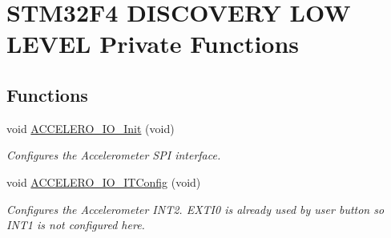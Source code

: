 \hypertarget{group___s_t_m32_f4___d_i_s_c_o_v_e_r_y___l_o_w___l_e_v_e_l___private___functions}{}\section{S\+T\+M32\+F4 D\+I\+S\+C\+O\+V\+E\+RY L\+OW L\+E\+V\+EL Private Functions}
\label{group___s_t_m32_f4___d_i_s_c_o_v_e_r_y___l_o_w___l_e_v_e_l___private___functions}
\subsection*{Functions}
\begin{DoxyCompactItemize}
\item 
\mbox{\label{group___s_t_m32_f4___d_i_s_c_o_v_e_r_y___l_o_w___l_e_v_e_l___private___functions_gaeb312e0ba50244c3008de6441167f181}} 
void \mbox{\hyperlink{group___s_t_m32_f4___d_i_s_c_o_v_e_r_y___l_o_w___l_e_v_e_l___private___functions_gaeb312e0ba50244c3008de6441167f181}{A\+C\+C\+E\+L\+E\+R\+O\+\_\+\+I\+O\+\_\+\+Init}} (void)
\begin{DoxyCompactList}\small\item\em Configures the Accelerometer S\+PI interface. \end{DoxyCompactList}\item 
\mbox{\label{group___s_t_m32_f4___d_i_s_c_o_v_e_r_y___l_o_w___l_e_v_e_l___private___functions_gacb0cf2419ee11c6c47c694e80f1e217b}} 
void \mbox{\hyperlink{group___s_t_m32_f4___d_i_s_c_o_v_e_r_y___l_o_w___l_e_v_e_l___private___functions_gacb0cf2419ee11c6c47c694e80f1e217b}{A\+C\+C\+E\+L\+E\+R\+O\+\_\+\+I\+O\+\_\+\+I\+T\+Config}} (void)
\begin{DoxyCompactList}\small\item\em Configures the Accelerometer I\+N\+T2. E\+X\+T\+I0 is already used by user button so I\+N\+T1 is not configured here. \end{DoxyCompactList}\item 
\mbox{\label{group___s_t_m32_f4___d_i_s_c_o_v_e_r_y___l_o_w___l_e_v_e_l___private___functions_gace44c34a627a0fb28c61366b9ca80b78}} 

\end{DoxyCompactItemize}
